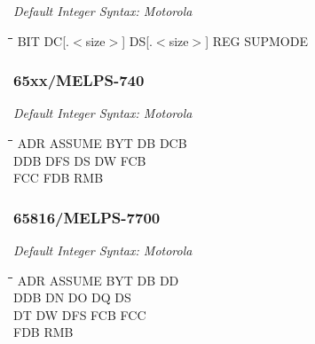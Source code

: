 {\em Default Integer Syntax: Motorola}

{\tt\begin{tabbing}
\hspace{3cm}\=\hspace{3cm}\=\hspace{3cm}\=\hspace{3cm}\=\kill
BIT        \> DC[.$<$size$>$]    \> DS[.$<$size$>$]   \> REG       \> SUPMODE \\
\end{tabbing}}

\subsubsection{65xx/MELPS-740}

{\em Default Integer Syntax: Motorola}

{\tt\begin{tabbing}
\hspace{3cm}\=\hspace{3cm}\=\hspace{3cm}\=\hspace{3cm}\=\kill
ADR        \> ASSUME      \> BYT         \> DB          \> DCB \\
DDB        \> DFS         \> DS          \> DW          \> FCB \\
FCC        \> FDB         \> RMB \\
\end{tabbing}}

\subsubsection{65816/MELPS-7700}

{\em Default Integer Syntax: Motorola}

{\tt\begin{tabbing}
\hspace{3cm}\=\hspace{3cm}\=\hspace{3cm}\=\hspace{3cm}\=\kill
ADR        \> ASSUME      \> BYT         \> DB          \> DD \\
DDB        \> DN          \> DO          \> DQ          \> DS \\
DT         \> DW          \> DFS         \> FCB         \> FCC \\
FDB        \> RMB \\
\end{tabbing}}

